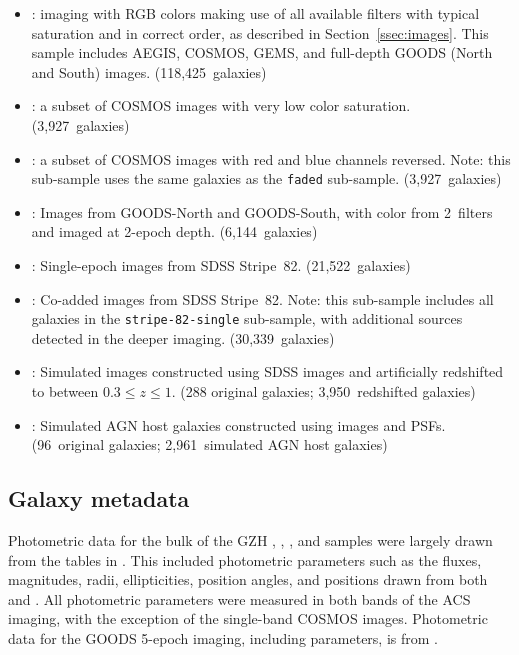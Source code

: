 \documentclass[twocolumn]{aastex6}
\begin{document}
\begin{itemize}

\item \main: \hst{} imaging with RGB colors making use of all available
filters with typical saturation and in correct order, as described in
Section~\ref{ssec:images}. This sample includes AEGIS, COSMOS, GEMS, and
full-depth GOODS (North and South) images. (118,425~galaxies)

\item \faded: a subset of COSMOS images with very low color saturation.
(3,927~galaxies)

\item \recolored: a subset of COSMOS images with red and blue channels
reversed. Note: this sub-sample uses the same galaxies as the \texttt{faded}
sub-sample. (3,927~galaxies)

\item \goods: Images from GOODS-North and GOODS-South, with
color from 2~filters and imaged at 2-epoch depth. (6,144~galaxies)

\item \stripe: Single-epoch images from SDSS Stripe~82.
(21,522~galaxies)

\item \coadd: Co-added images from SDSS Stripe~82. Note: this
sub-sample includes all galaxies in the \texttt{stripe-82-single} sub-sample,
with additional sources detected in the deeper imaging. (30,339~galaxies)

\item \redshifted: Simulated \hst{} images constructed using SDSS
images and artificially redshifted to between $0.3 \leq z \leq 1$. (288
original galaxies; 3,950~redshifted galaxies)

\item \simagn: Simulated AGN host galaxies constructed using
\hst{} images and PSFs. (96~original galaxies; 2,961~simulated AGN host
galaxies)


\end{itemize}


\subsection{Galaxy metadata}

Photometric data for the bulk of the GZH \main, \faded, \recolored, and
\goods{} samples were largely drawn from the tables in \citet{gri12}. This
included photometric parameters such as the fluxes, magnitudes, radii,
ellipticities, position angles, and positions drawn from both \sextractor{} and
\galfit.  All photometric parameters were measured in both bands of the ACS
imaging, with the exception of the single-band COSMOS images. Photometric data
for the GOODS 5-epoch imaging, including \sextractor{} parameters, is from
\citet{gia12}.
\end{document}
